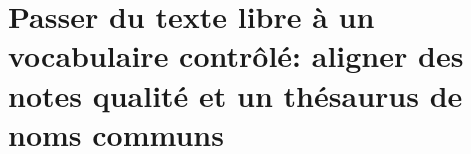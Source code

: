 \section{\label{I-B-3}Passer du texte libre à un vocabulaire contrôlé: aligner des notes qualité et un thésaurus de noms communs}
